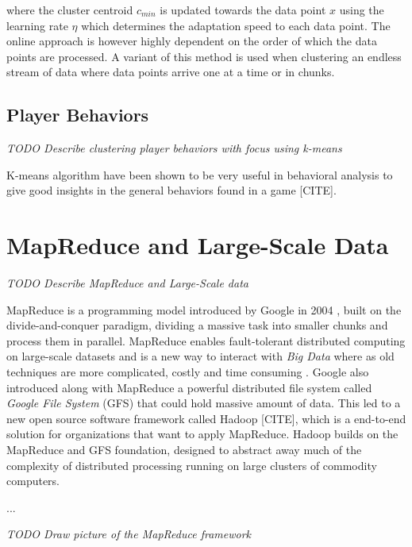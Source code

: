 where the cluster centroid $c_{min}$ is updated towards the data point $x$ using the learning rate $\eta$ which determines the adaptation speed to each data point. The online approach is however highly dependent on the order of which the data points are processed. A variant of this method is used when clustering an endless stream of data where data points arrive one at a time or in chunks.


\subsection{Player Behaviors}
\textit{TODO Describe clustering player behaviors with focus using k-means}

K-means algorithm have been shown to be very useful in behavioral analysis to give good insights in the general behaviors found in a game [CITE].

\lipsum[6]


\section{MapReduce and Large-Scale Data}
\textit{TODO Describe MapReduce and Large-Scale data}

MapReduce is a programming model introduced by Google in 2004 \citep{Dean:2004}, built on the divide-and-conquer paradigm, dividing a massive task into smaller chunks and process them in parallel. MapReduce enables fault-tolerant distributed computing on large-scale datasets and is a new way to interact with \textit{Big Data} where as old techniques are more complicated, costly and time consuming \citep{Dean:2004}. Google also introduced along with MapReduce a powerful distributed file system called \textit{Google File System} (GFS) that could hold massive amount of data. This led to a new open source software framework called Hadoop [CITE], which is a end-to-end solution for organizations that want to apply MapReduce. Hadoop builds on the MapReduce and GFS foundation, designed to abstract away much of the complexity of distributed processing running on large clusters of commodity computers. 

...

\textit{TODO Draw picture of the MapReduce framework}

\lipsum[7-9]


